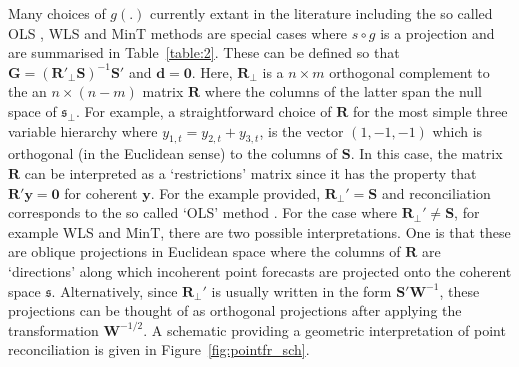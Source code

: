 \documentclass[a4paper, 11pt]{article}
\theoremstyle{theo}
\theoremstyle{definition}
\begin{document}
Many choices of $g(.)$ currently extant in the literature including the so called OLS \cite{Hyndman2011}, WLS  and MinT\cite{Wickramasuriya2017} methods are special cases where $s\circ g$ is a projection and are summarised in Table~\ref{table:2}.  These can be defined so that ${\bm G}=\left({\bm R'_{\perp}}{\bm S}\right)^{-1}{\bm S}'$ and ${\bm d}={\bm 0}$.  Here, ${\bm R_{\perp}}$ is a $n\times m$ orthogonal complement to the an $n \times (n-m)$ matrix $\bm{R}$ where the columns of the latter span the null space of $\mathfrak{s}_{\perp}$.  For example, a straightforward choice of $\bm{R}$ for the most simple three variable hierarchy where $y_{1,t}=y_{2,t}+y_{3,t}$, is the vector $(1,-1,-1)$ which is orthogonal (in the Euclidean sense) to the columns of $\bm{S}$.  In this case, the matrix $\bm{R}$ can be interpreted as a `restrictions' matrix since it has the property that $\bm{R}'\bm{y}=\bm{0}$ for coherent $\bm{y}$.  For the example provided, ${\bm R}_\perp'={\bm S}$ and reconciliation corresponds to the so called `OLS' method \cite{Hyndman2011}.  For the case where ${\bm R}_\perp'\neq{\bm S}$, for example WLS and MinT, there are two possible interpretations.  One is that these are oblique projections in Euclidean space where the columns of $\bm{R}$ are `directions' along which incoherent point forecasts are projected onto the coherent space $\mathfrak{s}$.  Alternatively, since ${\bm R}_\perp'$ is usually written in the form ${\bm S}'{\bm W}^{-1}$, these projections can be thought of as orthogonal projections after applying the transformation ${\bm W^{-1/2}}$.  A schematic providing a geometric interpretation of point reconciliation is given in Figure~\ref{fig:pointfr_sch}. 
\end{document}
